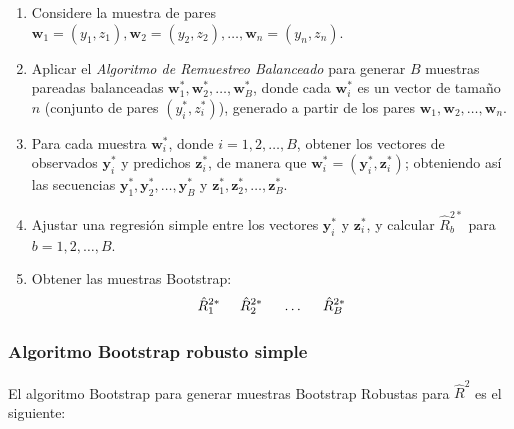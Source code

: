 \begin{enumerate}
	\item Considere la muestra de pares \( \mathbf{w}_{1} = (y_{1}, z_{1}), \mathbf{w}_{2} = (y_{2}, z_{2}), \dots, \mathbf{w}_{n} = (y_{n}, z_{n}) \).
	
	\item Aplicar el \textit{Algoritmo de Remuestreo Balanceado} para generar \( B \) muestras pareadas balanceadas \( \mathbf{w}^{*}_{1}, \mathbf{w}^{*}_{2}, \dots, \mathbf{w}^{*}_{B} \), donde cada \( \mathbf{w}^{*}_{i} \) es un vector de tamaño \( n \) (conjunto de pares \( (y_{i}^{*}, z_{i}^{*}) \)), generado a partir de los pares \( \mathbf{w}_{1}, \mathbf{w}_{2}, \dots, \mathbf{w}_{n} \).
	
	\item Para cada muestra \( \mathbf{w}^{*}_{i} \), donde \( i = 1, 2, \dots, B \), obtener los vectores de observados \( \mathbf{y}^{*}_{i} \) y predichos \( \mathbf{z}^{*}_{i} \), de manera que \( \mathbf{w}^{*}_{i} = (\mathbf{y}_{i}^{*}, \mathbf{z}_{i}^{*}) \); obteniendo así las secuencias \( \mathbf{y}_{1}^{*}, \mathbf{y}_{2}^{*}, \dots, \mathbf{y}_{B}^{*} \) y \( \mathbf{z}_{1}^{*}, \mathbf{z}_{2}^{*}, \dots, \mathbf{z}_{B}^{*} \).
	
	\item Ajustar una regresión simple entre los vectores \( \mathbf{y}^{*}_{i} \) y \( \mathbf{z}_{i}^{*} \), y calcular \( \hat{R}^{2*}_{b} \) para \( b = 1, 2, \dots, B \).
	
	\item Obtener las muestras Bootstrap:
	\[
	\hat{R}^{2*}_{1} \hspace{.5cm} \hat{R}^{2*}_{2} \hspace{.5cm} \dots \hspace{.5cm} \hat{R}^{2*}_{B}
	\]
\end{enumerate}



\subsubsection{Algoritmo Bootstrap robusto simple \parencite{zacarias-2023} }
El algoritmo Bootstrap para generar muestras Bootstrap Robustas para $\hat{R}^{2}$ es el siguiente:

